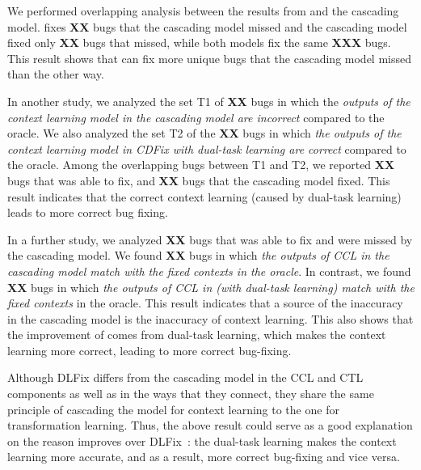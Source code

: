 We performed overlapping analysis between the results
from {\tool} and the cascading model. {\tool} fixes {\bf XX} bugs that
the cascading model missed and the cascading model fixed only {\bf XX}
bugs that {\tool} missed, while both models fix the same {\bf XXX}
bugs. This result shows that {\tool} can fix more unique bugs
that the cascading model missed than the other way.

In another study, we analyzed the set T1 of {\bf XX} bugs in which the
{\em outputs of the context learning model in the cascading model are
  incorrect} compared to the oracle. We also analyzed the set T2 of
the {\bf XX} bugs in which {\em the outputs of the context learning
  model in CDFix with dual-task learning are correct} compared to the
oracle. Among the overlapping bugs between T1 and T2, we reported {\bf
  XX} bugs that {\tool} was able to fix, and {\bf XX} bugs that the
cascading model fixed.  This result indicates that the correct context
learning (caused by dual-task learning) leads to more correct bug
fixing.

In a further study, we analyzed {\bf XX} bugs that {\tool} was able to
fix and were missed by the cascading model. We found {\bf XX} bugs in
which {\em the outputs of CCL in the cascading model match with the
  fixed contexts in the oracle}. In contrast, we found {\bf XX} bugs
in which {\em the outputs of CCL in {\tool} (with dual-task learning)
  match with the fixed contexts} in the oracle. This result indicates
that a source of the inaccuracy in the cascading model is the
inaccuracy of context learning. This also shows that the improvement
of {\tool} comes from dual-task learning, which makes the context
learning more correct, leading to more correct bug-fixing.





Although DLFix differs from the cascading model in the CCL and CTL
components as well as in the ways that they connect, they share the
same principle of cascading the model for context learning to the one
for transformation learning. Thus, the above result could serve as a
good explanation on the reason {\tool} improves over
DLFix~\cite{icse20}: the dual-task learning makes the context learning
more accurate, and as a result, more correct bug-fixing and vice
versa.

